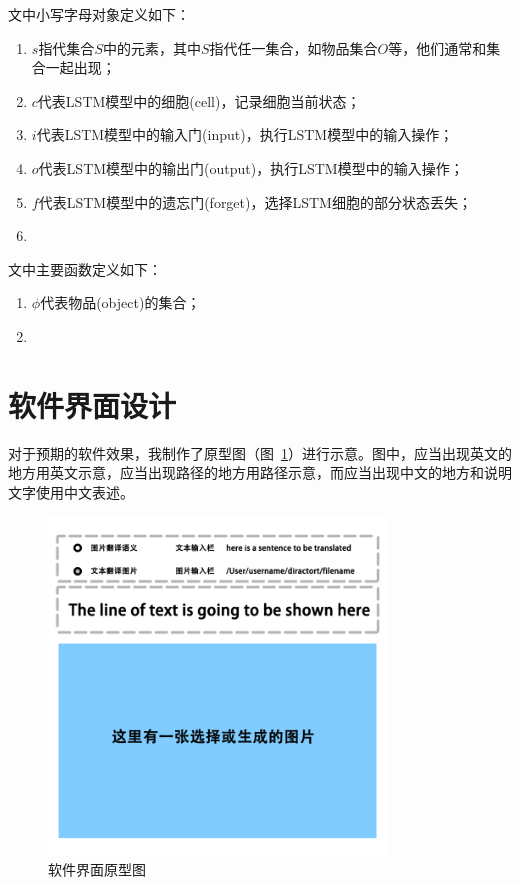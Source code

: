 文中小写字母对象定义如下：
\begin{enumerate}[fullwidth,itemindent=2em,label=\arabic*.]
    \item $s$指代集合$S$中的元素，其中$S$指代任一集合，如物品集合$O$等，他们通常和集合一起出现；
    \item $c$代表LSTM模型中的细胞(cell)，记录细胞当前状态；
    \item $i$代表LSTM模型中的输入门(input)，执行LSTM模型中的输入操作；
    \item $o$代表LSTM模型中的输出门(output)，执行LSTM模型中的输入操作；
    \item $f$代表LSTM模型中的遗忘门(forget)，选择LSTM细胞的部分状态丢失；
    \item 
\end{enumerate}

文中主要函数定义如下：
\begin{enumerate}[fullwidth,itemindent=2em,label=\arabic*.]
    \item $\phi$代表物品(object)的集合；
    \item 
\end{enumerate}

\section{软件界面设计}
对于预期的软件效果，我制作了原型图（图~\ref{fig:UIproto}）进行示意。图中，应当出现英文的地方用英文示意，应当出现路径的地方用路径示意，而应当出现中文的地方和说明文字使用中文表述。
\begin{figure}[!htb]
    \centering
    \includegraphics[width=0.8\textwidth]{figures/界面原型图.png}
    \caption{软件界面原型图}
    \label{fig:UIproto}
  \end{figure}

